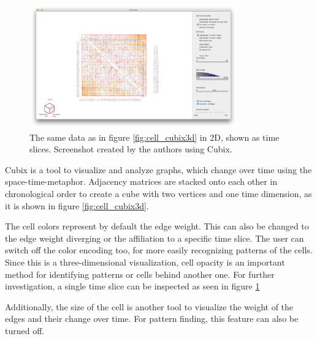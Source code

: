 \begin{figure}[tp]
\centering
\includegraphics[width=0.8\textwidth]{images/cubix2d_cell}
\caption[Time Slices in Cubix]{The same data as in figure \ref{fig:cell_cubix3d} in 2D, shown as time slices. Screenshot created by the authors using Cubix. \citep[877--886]{bach-cubix-2014}\label{fig:cell_cubix2d}}
\end{figure}


Cubix is a tool to visualize and analyze graphs, which change over time using the space-time-metaphor. Adjacency matrices are stacked onto each other in chronological order to create a cube with two vertices and one time dimension, as it is shown in figure \ref{fig:cell_cubix3d}.

The cell colors represent by default the edge weight. This can also be changed to the edge weight diverging or the affiliation to a specific time slice. The user can switch off the color encoding too, for more easily recognizing patterns of the cells. Since this is a three-dimensional visualization, cell opacity is an important method for identifying patterns or cells behind another one. For further investigation, a single time slice can be inspected as seen in figure \ref{fig:cell_cubix2d}

Additionally, the size of the cell is another tool to visualize the weight of the edges and their change over time. For pattern finding, this feature can also be turned off.  \citep[877--886]{bach-cubix-2014}
